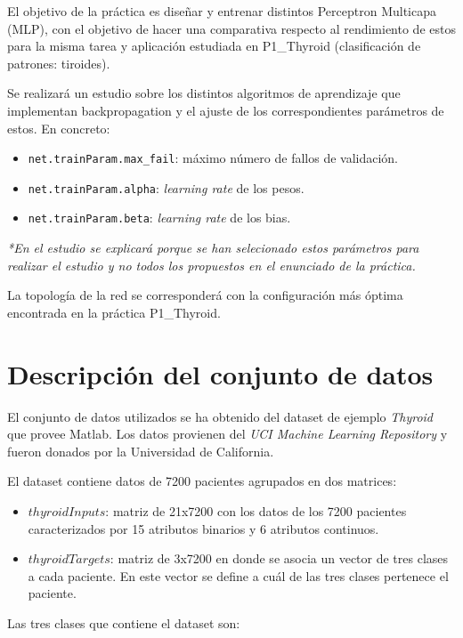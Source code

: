 \documentclass[a4paper,12pt,titlepage]{article}
\begin{document}
El objetivo de la práctica es diseñar y entrenar distintos Perceptron Multicapa (MLP), con el objetivo de hacer una comparativa respecto al rendimiento de estos para la misma tarea y aplicación estudiada en P1\_Thyroid (clasificación de patrones: tiroides).

Se realizará un estudio sobre los distintos algoritmos de aprendizaje que
implementan backpropagation y el ajuste de los correspondientes parámetros de estos. En concreto:

\begin{itemize}[noitemsep]
	\item \lstinline|net.trainParam.max_fail|: máximo número de fallos de validación.
	\item \lstinline|net.trainParam.alpha|: \textit{learning rate} de los pesos.
	\item \lstinline|net.trainParam.beta|: \textit{learning rate} de los bias.
\end{itemize}

\textit{*En el estudio se explicará porque se han selecionado estos parámetros para realizar el estudio y no todos los propuestos en el enunciado de la práctica.}

La topología de la red se corresponderá con la configuración más óptima encontrada en la práctica P1\_Thyroid.

\section{Descripción del conjunto de datos}

El conjunto de datos utilizados se ha obtenido del dataset de ejemplo \emph{Thyroid} que provee Matlab. Los datos provienen del \emph{UCI Machine Learning Repository} \citep{Asuncion+Newman:2007} y fueron donados por la Universidad de California.

El dataset contiene datos de 7200 pacientes agrupados en dos matrices:

\begin{itemize}[noitemsep]
	\item $thyroidInputs$: matriz de 21x7200 con los datos de los 7200 pacientes caracterizados por 15 atributos binarios y 6 atributos continuos.
	\item $thyroidTargets$: matriz de 3x7200 en donde se asocia un vector de tres clases a cada paciente. En este vector se define a cuál de las tres clases pertenece el paciente.
\end{itemize}

Las tres clases que contiene el dataset son:
\end{document}
